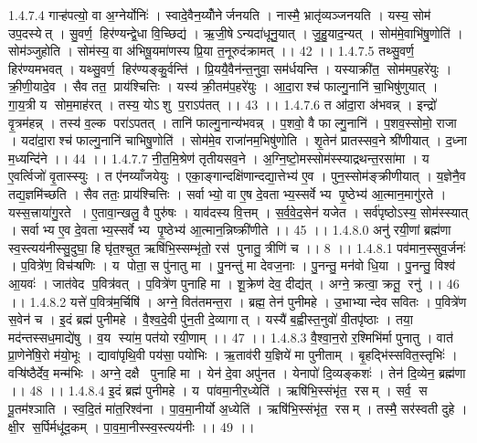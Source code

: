 1.4.7.4
गाऱ्ह॑पत्यो॒ वा अ॒ग्नेर्योनिः॑ । स्वादे॒वैन॒य्योँनेर्जनयति । नास्मै॒ भ्रातृ॑व्यञ्जनयति । यस्य॒ सोम॑ उप॒दस्येत् । सु॒वर्ण॒॒ हिर॑ण्यन्द्वे॒धा वि॒च्छिद्य॑ । ऋ॒जी॒षेऽन्यदा॑धूनु॒यात् । जु॒हु॒याद॒न्यत् । सोम॑मे॒वाभि॑षु॒णोति॑ । सोम॑ञ्जुहोति । सोम॑स्य॒ वा अ॑भिषू॒यमा॑णस्य प्रि॒या त॒नूरुद॑क्रामत् ।। 42 ।।
1.4.7.5
तथ्सु॒वर्ण॒॒ हिर॑ण्यमभवत् । यथ्सु॒वर्ण॒॒ हिर॑ण्यङ्कु॒र्वन्ति॑ । प्रि॒ययै॒वैन॑न्त॒नुवा॒ सम॑र्धयन्ति । यस्याक्री॑त॒॒ सोम॑मप॒हरे॑युः । क्री॒णी॒यादे॒व । सैव तत॒ प्राय॑श्चित्तिः । यस्य॑ क्री॒तम॑प॒हरे॑युः । आ॒दा॒राश्च॑ फाल्गु॒नानि॑ चा॒भिषु॑णुयात् । गा॒य॒त्री य सोम॒माह॑रत् । तस्य॒ योऽ॑शु प॒राऽप॑तत् ।। 43 ।।
1.4.7.6
त आ॑दा॒रा अ॑भवन्न् । इन्द्रो॑ वृ॒त्रम॑हन्न् । तस्य॑ व॒ल्क परा॑ऽपतत् । तानि॑ फाल्गु॒नान्य॑भवन्न् । प॒शवो॒ वै फाल्गु॒नानि॑ । प॒शव॒स्सोमो॒ राजा । यदा॑दा॒राश्च॑ फाल्गु॒नानि॑ चाभिषु॒णोति॑ । सोम॑मे॒व राजा॑नम॒भिषु॑णोति । शृ॒तेन॑ प्रातस्सव॒ने श्री॑णीयात् । द॒ध्ना म॒ध्यन्दि॑ने ।। 44 ।।
1.4.7.7
नी॒त॒मि॒श्रेण॑ तृतीयसव॒ने । अ॒ग्नि॒ष्टो॒मस्सोम॑स्स्याद्रथन्त॒रसा॑मा । य ए॒वर्त्विजो॑ वृ॒तास्स्युः । त ए॑नय्याँजयेयुः । एका॒ङ्गान्दक्षि॑णान्दद्या॒त्तेभ्य॑ ए॒व । पुन॒स्सोम॑ङ्क्रीणीयात् । य॒ज्ञेनै॒व तद्य॒ज्ञमि॑च्छति । सैव ततः॒ प्राय॑श्चित्तिः । सर्वाभ्यो॒ वा ए॒ष दे॒वताभ्य॒स्सर्वेभ्य पृ॒ष्ठेभ्य॑ आ॒त्मान॒मागु॑रते । यस्स॒त्त्राया॑गु॒रते । ए॒तावा॒न्खलु॒ वै पुरु॑षः । याव॑दस्य वि॒त्तम् । स॒र्व॒वे॒द॒सेन॑ यजेत । सर्व॑पृष्ठोऽस्य॒ सोम॑स्स्यात् । सर्वाभ्य ए॒व दे॒वताभ्य॒स्सर्वेभ्य पृ॒ष्ठेभ्य॑ आ॒त्मान॒न्निष्क्री॑णीते ।। 45 ।।
1.4.8.0
अनु॑ रयी॒णां ब्रह्म॑णा स्व॒स्त्यय॑नीस्सु॒दुघा॒ हि घृ॑त॒श्चुत॒ ऋषि॑भि॒स्सम्भृ॑तो॒ रस॑ पुनातु॒ त्रीणि॑ च ।। 8 ।।
1.4.8.1
पव॑मान॒स्सुव॒र्जनः॑ । प॒वित्रे॑ण॒ विच॑ऱ्षणिः । य पोता॒ स पु॑नातु मा । पु॒नन्तु॑ मा देवज॒नाः । पु॒नन्तु॒ मन॑वो धि॒या । पु॒नन्तु॒ विश्व॑ आ॒यवः॑ । जात॑वेद प॒वित्र॑वत् । प॒वित्रे॑ण पुनाहि मा । शू॒क्रेण॑ देव॒ दीद्य॑त् । अग्ने॒ क्रत्वा॒ क्रतू॒ रनु॑ ।। 46 ।।
1.4.8.2
यत्ते॑ प॒वित्र॑म॒र्चिषि॑ । अग्ने॒ वित॑तमन्त॒रा । ब्रह्म॒ तेन॑ पुनीमहे । उ॒भाभ्यान्देव सवितः । प॒वित्रे॑ण स॒वेन॑ च । इ॒दं ब्रह्म॑ पुनीमहे । वै॒श्व॒दे॒वी पु॑न॒ती दे॒व्यागात् । यस्यै॑ ब॒ह्वीस्त॒नुवो॑ वी॒तपृ॑ष्ठाः । तया॒ मद॑न्तस्सध॒माद्ये॑षु । व॒य स्या॑म॒ पत॑यो रयी॒णाम् ।। 47 ।।
1.4.8.3
वै॒श्वा॒न॒रो र॒श्मिभि॑र्मा पुनातु । वात॑ प्रा॒णेने॑षि॒रो म॑यो॒भूः । द्यावा॑पृथि॒वी पय॑सा॒ पयो॑भिः । ऋ॒ताव॑री य॒ज्ञिये॑ मा पुनीताम् । बृ॒हद्भि॑स्सवित॒स्तृभिः॑ । वऱ्षि॑ष्ठैर्देव॒ मन्म॑भिः । अग्ने॒ दक्षै पुनाहि मा । येन॑ दे॒वा अपु॑नत । येनापो॑ दि॒व्यङ्कशः॑ । तेन॑ दि॒व्येन॒ ब्रह्म॑णा ।। 48 ।।
1.4.8.4
इ॒दं ब्रह्म॑ पुनीमहे । य पा॑वमा॒नीर॒ध्येति॑ । ऋषि॑भि॒स्संभृ॑त॒॒ रसम् । सर्व॒॒ स पू॒तम॑श्ञाति । स्व॒दि॒तं मा॑त॒रिश्व॑ना । पा॒व॒मा॒नीर्यो अ॒ध्येति॑ । ऋषि॑भि॒स्संभृ॑त॒॒ रसम् । तस्मै॒ सर॑स्वती दुहे । क्षी॒र स॒र्पिर्मधू॑द॒कम् । पा॒व॒मा॒नीस्स्व॒स्त्यय॑नीः ।। 49 ।।
